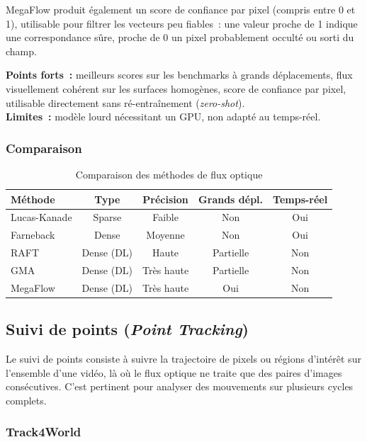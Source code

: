 MegaFlow produit également un score de confiance par pixel (compris entre 0 et 1), utilisable pour filtrer les vecteurs peu fiables~: une valeur proche de 1 indique une correspondance sûre, proche de 0 un pixel probablement occulté ou sorti du champ.

\medskip
\noindent\textbf{Points forts~:} meilleurs scores sur les benchmarks à grands déplacements, flux visuellement cohérent sur les surfaces homogènes, score de confiance par pixel, utilisable directement sans ré-entraînement (\textit{zero-shot}).\\
\textbf{Limites~:} modèle lourd nécessitant un GPU, non adapté au temps-réel.

\subsubsection*{Comparaison}

\begin{table}[h]
\centering
\caption{Comparaison des méthodes de flux optique}
\label{tab:optical_flow}
\begin{tabular}{lcccc}
\toprule
\textbf{Méthode} & \textbf{Type} & \textbf{Précision} & \textbf{Grands dépl.} & \textbf{Temps-réel} \\
\midrule
Lucas-Kanade & Sparse     & Faible    & Non      & Oui \\
Farneback    & Dense      & Moyenne    & Non      & Oui \\
RAFT         & Dense (DL) & Haute      & Partielle & Non \\
GMA          & Dense (DL) & Très haute & Partielle & Non \\
MegaFlow     & Dense (DL) & Très haute & Oui      & Non \\
\bottomrule
\end{tabular}
\end{table}

\subsection{Suivi de points (\textit{Point Tracking})}

Le suivi de points consiste à suivre la trajectoire de pixels ou régions d'intérêt sur l'ensemble d'une vidéo, là où le flux optique ne traite que des paires d'images consécutives. C'est pertinent pour analyser des mouvements sur plusieurs cycles complets.

\subsubsection{Track4World}

